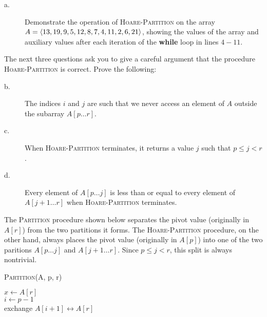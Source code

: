 \begin{description}
\item[a. \hspace{9pt}] Demonstrate the operation of \textsc{Hoare-Partition} on the array $A=\langle13, 19, 9, 5, 12, 8, 7, 4, 11,\\ 2, 6, 21\rangle$, showing the values of
the array and auxiliary values after each iteration of the \textbf{while} loop in lines $4-11$.\\

\end{description}
The next three questions ask you to give a careful argument that the procedure \textsc{Hoare-Partition} is correct. Prove the following:

\begin{description}
\item[b. \hspace{9pt}] The indices $i$ and $j$ are such that we never access an element of $A$ outside the subarray $A[p\ldots r]$.

\item[c. \hspace{9pt}] When \textsc{Hoare-Partition} terminates, it returns a value $j$ such that $p\leq j < r$.

\item[d. \hspace{9pt}] Every element of $A[p\ldots j]$ is less than or equal to every element of $A[j + 1\ldots r]$ when \textsc{Hoare-Partition} terminates.
\end{description}

The \textsc{Partition} procedure shown below separates the pivot value (originally in $A[r]$) from the two partitions it forms. The \textsc{Hoare-Partition} procedure,
on the other hand, always places the pivot value (originally in $A[p]$) into one of the two paritions $A[p\ldots j]$ and $A[j + 1\ldots r]$. Since $p\leq j < r$, this
split is always nontrivial.

\begin{algorithm}[H]
\caption{\textsc{Partition}(A, p, r)}
$x\leftarrow A[r]$\\
$i \leftarrow p - 1$\\
exchange $A[i + 1]\leftrightarrow A[r]$\\
\end{algorithm}

